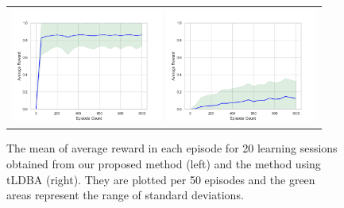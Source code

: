 \begin{figure}[tbp]
 \centering
 \begin{tabular}{c}
  \begin{minipage}{0.5\hsize}
     \centering
     \includegraphics[bb=0 0 461 346, height = 3.8cm, width=5cm]{ep_1000_it_10000_MDP3_gamma_095_re2_ini22_nts_c095_100times_per50_no2.png}
 \end{minipage}

 \begin{minipage}{0.5\hsize}
   \centering
   \includegraphics[bb=0 0 461 346, height = 3.8cm, width=5cm]{ep_1000_it_10000_MDP3_gamma_095_nts_c095_ldba_100times_per50.png}
 \end{minipage}
\end{tabular}
 \caption{The mean of average reward in each episode for 20 learning sessions obtained from our proposed method (left) and the method using tLDBA (right). They are plotted per 50 episodes and the green areas represent the range of standard deviations. }
 \label{result}
\end{figure}

